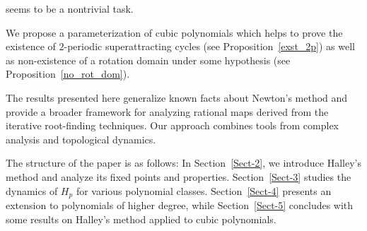 \documentclass[12pt]{article}
\begin{document}
seems to be a nontrivial task.
\par
We propose a parameterization of cubic polynomials which helps to prove the existence of $2$-periodic superattracting cycles (see Proposition~\ref{exst_2p}) as well as non-existence of a rotation domain under some hypothesis (see Proposition~\ref{no_rot_dom}).
\par
The results presented here generalize known facts about Newton’s method and provide a broader framework for analyzing rational maps derived from the iterative root-finding techniques. Our approach combines tools from complex analysis and topological dynamics.
\par
The structure of the paper is as follows: In Section~\ref{Sect-2}, we introduce Halley’s method and analyze its fixed points and properties. Section~\ref{Sect-3} studies the dynamics of $ H_p $ for various polynomial classes. Section~\ref{Sect-4} presents an extension to polynomials of higher degree, while Section~\ref{Sect-5} concludes with some results on Halley's method applied to cubic polynomials.
\end{document}
